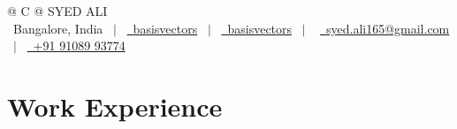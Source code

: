\documentclass[a4paper,margin=0.5in,10pt]{article}
\makeatletter
\newenvironment{jobshort}[2]
    {
    \begin{tabularx}{\linewidth}{@{}l X r@{}}
    \textbf{#1} & \hfill &  #2 \\[3.75pt]
    \end{tabularx}
    }
    {
    }
\makeatother
\begin{document}
\pagestyle{empty} 



\begin{tabularx}{\linewidth}{@{} C @{}}
\Huge{SYED ALI}\\[7.5pt]
{\raisebox{-0.05\height}\faMapMarker\ Bangalore, India} \ $|$ \ 
\href{https://github.com/basisvectors}{\raisebox{-0.05\height}\faGithub\ basisvectors} \ $|$ \ 
\href{https://linkedin.com/in/basisvectors}{\raisebox{-0.05\height}\faLinkedin\ basisvectors} \ $|$ \ 
\href{mailto:syed.ali165@gmail.com}{\raisebox{-0.05\height}\faEnvelope \ syed.ali165@gmail.com} \ $|$ \ 
\href{tel:+919108993774}{\raisebox{-0.05\height}\faMobile \ +91 91089 93774}\\
\end{tabularx}



\section{Work Experience}

\end{document}
